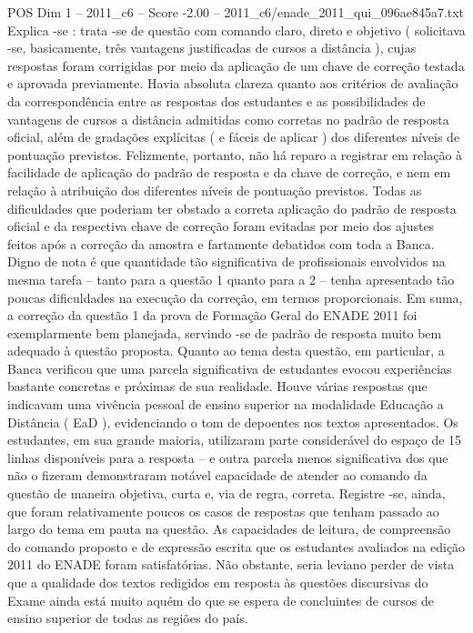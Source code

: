 \begin{textsample}{POS Dim 1 – 2011\_c6 – Score -2.00 – 2011\_c6/enade\_2011\_qui\_096ae845a7.txt}
Explica -se : trata -se de questão com comando claro, direto e objetivo ( solicitava -se, basicamente, três vantagens justificadas de cursos a distância ), cujas respostas foram corrigidas por meio da aplicação de um chave de correção testada e aprovada previamente.
Havia absoluta clareza quanto aos critérios de avaliação da correspondência entre as respostas dos estudantes e as possibilidades de vantagens de cursos a distância admitidas como corretas no padrão de resposta oficial, além de gradações explícitas ( e fáceis de aplicar ) dos diferentes níveis de pontuação previstos.
Felizmente, portanto, não há reparo a registrar em relação à facilidade de aplicação do padrão de resposta e da chave de correção, e nem em relação à atribuição dos diferentes níveis de pontuação previstos.
Todas as dificuldades que poderiam ter obstado a correta aplicação do padrão de resposta oficial e da respectiva chave de correção foram evitadas por meio dos ajustes feitos após a correção da amostra e fartamente debatidos com toda a Banca.
Digno de nota é que quantidade tão significativa de profissionais envolvidos na mesma tarefa – tanto para a questão 1 quanto para a 2 – tenha apresentado tão poucas dificuldades na execução da correção, em termos proporcionais.
Em suma, a correção da questão 1 da prova de Formação Geral do ENADE 2011 foi exemplarmente bem planejada, servindo -se de padrão de resposta muito bem adequado à questão proposta.
Quanto ao tema desta questão, em particular, a Banca verificou que uma parcela significativa de estudantes evocou experiências bastante concretas e próximas de sua realidade.
Houve várias respostas que indicavam uma vivência pessoal de ensino superior na modalidade Educação a Distância ( EaD ), evidenciando o tom de depoentes nos textos apresentados.
Os estudantes, em sua grande maioria, utilizaram parte considerável do espaço de 15 linhas disponíveis para a resposta – e outra parcela menos significativa dos que não o fizeram demonstraram notável capacidade de atender ao comando da questão de maneira objetiva, curta e, via de regra, correta.
Registre -se, ainda, que foram relativamente poucos os casos de respostas que tenham passado ao largo do tema em pauta na questão.
As capacidades de leitura, de compreensão do comando proposto e de expressão escrita que os estudantes avaliados na edição 2011 do ENADE foram satisfatórias.
Não obstante, seria leviano perder de vista que a qualidade dos textos redigidos em resposta às questões discursivas do Exame ainda está muito aquém do que se espera de concluintes de cursos de ensino superior de todas as regiões do país.

\end{textsample}
